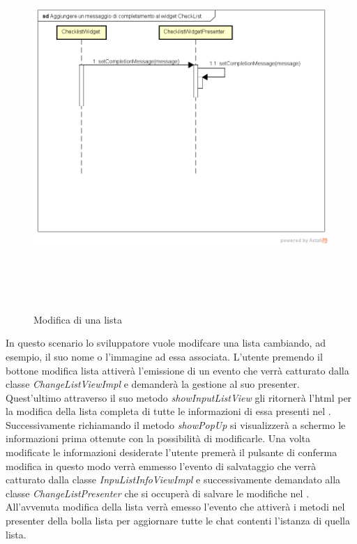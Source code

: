 \label{Modifca di un lista}
\begin{figure}[ht]
	\centering
	\includegraphics[width=16cm, height=14cm]{Sezioni/Diagrammi/img/Aggiungere un messaggio di completamento al widget Checklist.png}
	\caption{Modifica di una lista}
\end{figure}

In questo scenario lo sviluppatore vuole modifcare una lista cambiando, ad esempio, il suo nome o l'immagine ad essa associata. L'utente premendo il bottone modifica lista attiverà l'emissione di un evento che verrà catturato dalla classe \textit{ChangeListViewImpl} e demanderà la  gestione al suo presenter. Quest'ultimo attraverso il suo  metodo \textit{showInputListView} gli ritornerà l'html per la modifica della lista completa di tutte le informazioni di essa presenti nel . Successivamente richiamando il metodo \textit{showPopUp} si visualizzerà a schermo  le informazioni prima ottenute con la possibilità di modificarle. Una volta modificate le informazioni desiderate l'utente premerà il pulsante di conferma modifica in questo modo verrà emmesso l'evento di salvataggio che verrà catturato dalla classe \textit{InpuListInfoViewImpl} e successivamente demandato alla classe \textit{ChangeListPresenter} che si occuperà di salvare le modifiche nel .
All'avvenuta modifica della lista  verrà emesso l'evento che attiverà i metodi nel presenter della bolla lista per aggiornare tutte le chat contenti l'istanza di quella lista.
 
